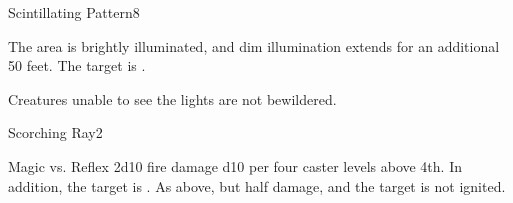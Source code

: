 \begin{spellsection}{Scintillating Pattern}{8}
\begin{spellheader}
\end{spellheader}
\begin{spellcontent}
    \begin{spelltargetinginfo}
    \end{spelltargetinginfo}
    \begin{spelleffects}
        \spelleffect The area is brightly illuminated, and dim illumination extends for an additional 50 feet.
        \spelleffect The target is \bewildered.
        \spelldur \durshort
    \end{spelleffects}
\end{spellcontent}
\begin{spellfooter}
    \spellnotes Creatures unable to see the lights are not bewildered.
\end{spellfooter}
\end{spellsection}

\begin{spellsection}{Scorching Ray}{2}
\begin{spellheader}
    \begin{spelltargetinginfo}
    \end{spelltargetinginfo}
\end{spellheader}
\begin{spellcontent}
    \begin{spelleffects}
        \begin{spellattack}{Magic vs. Reflex}
            \spellsuccess 2d10 fire damage \add d10 per four caster levels above 4th. In addition, the target is \ignited.
            \spellfailure As above, but half damage, and the target is not ignited.
        \end{spellattack}
        \spelldur \durshort
    \end{spelleffects}
\end{spellcontent}
\begin{spellfooter}
\end{spellfooter}
\end{spellsection}

